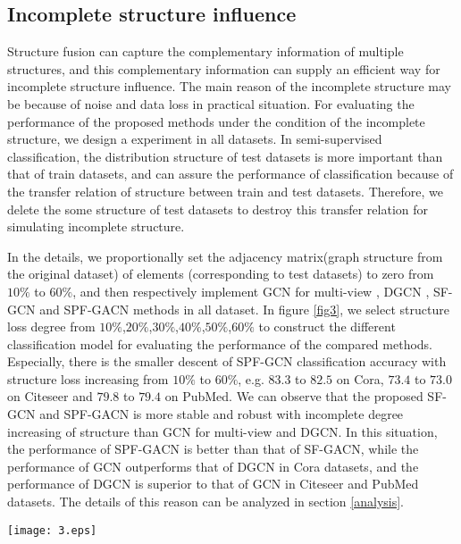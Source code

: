 \documentclass[review]{elsarticle}
\begin{document}
\subsection{Incomplete structure influence}
Structure fusion can capture the complementary information of multiple structures, and this complementary information can supply an efficient way for incomplete structure influence. The main reason of the incomplete structure may be because of noise and data loss in practical situation. For evaluating the performance of the proposed methods under the condition of the incomplete structure, we design a experiment in all datasets. In semi-supervised classification, the distribution structure of test datasets is more important than that of train datasets, and can assure the performance of classification because of the transfer relation of structure between train and test datasets. Therefore, we delete the some structure of test datasets to destroy this transfer relation for simulating incomplete structure.

In the details, we proportionally set the adjacency matrix(graph structure from the original dataset) of elements (corresponding to test datasets) to zero from $10\%$ to $60\%$, and then respectively implement GCN for multi-view \cite{kipf2016semi}, DGCN \cite{zhuang2018dual}, SF-GCN and SPF-GACN methods in all dataset. In figure \ref{fig3}, we select structure loss degree from $10\%$,$20\%$,$30\%$,$40\%$,$50\%$,$60\%$ to construct the different classification model for evaluating the performance of the compared methods. Especially, there is the smaller descent of SPF-GCN classification accuracy with structure loss increasing from $10\%$ to $60\%$, e.g. $83.3$ to $82.5$ on Cora, $73.4$ to $73.0$ on Citeseer and $79.8$ to $79.4$ on PubMed. We can observe that the proposed SF-GCN and SPF-GACN is more stable and robust with incomplete degree increasing of structure than GCN for multi-view and DGCN. In this situation, the performance of SPF-GACN is better than that of SF-GACN, while the performance of GCN outperforms that of DGCN in Cora datasets, and the performance of DGCN is superior to that of GCN in Citeseer and PubMed datasets. The details of this reason can be analyzed in section \ref{analysis}.

\begin{figure*}[ht]
 \begin{center}
\texttt{[image: 3.eps]}
\vspace{-0.2in}
 \caption{Impact of structure loss on classification accuracy for citation networks on (a) Cora,(b)Citeseer and (c)PubMed datasets.}
  \label{fig3}
  \end{center}
 \end{figure*}
\end{document}
